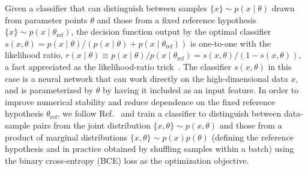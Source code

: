 \documentclass[]{article}
\begin{document}
Given a classifier that can distinguish between samples $\{x\} \sim p(x\mid\theta)$ drawn from parameter points $\theta$ and those from a fixed reference hypothesis $\{x\} \sim p(x\mid\theta_\mathrm{ref})$, the decision function output by the optimal classifier $s(x, \theta) = {p(x\mid\theta)}/{\left(p(x\mid\theta) + p(x\mid\theta_\mathrm{ref})\right)}$ is one-to-one with the likelihood ratio, $r(x\mid \theta) \equiv {p(x\mid\theta)}/{p(x\mid\theta_\mathrm{ref})}  = {s(x, \theta)}/{\left(1 - s(x, \theta)\right)}$, a fact appreciated as the likelihood-ratio trick~\citep{Cranmer:2015bka,mohamed2017learning}. 
The classifier $s(x, \theta)$ in this case is a neural network that can work directly on the high-dimensional data $x$, and is parameterized by $\theta$ by having it included as an input feature. In order to improve numerical stability and reduce dependence on the fixed reference hypothesis $\theta_\mathrm{ref}$, we follow Ref.~\cite{Hermans:2019ioj} and train a classifier to distinguish between data-sample pairs from the joint distribution $\{x, \theta\} \sim p(x,\theta)$ and those from a product of marginal distributions $\{x, \theta\} \sim p(x)p(\theta)$ (defining the reference hypothesis and in practice obtained by shuffling samples within a batch) using the binary cross-entropy (BCE) loss as the optimization objective.  
\end{document}
